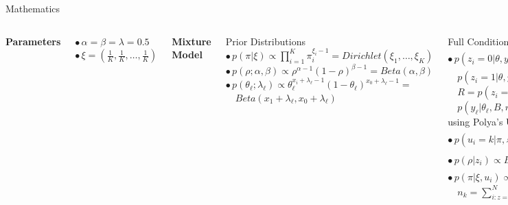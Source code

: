 \documentclass[letter,graphicx]{beamer}
\begin{document}
\begin{frame}{Mathematics}
\begin{tiny}
\begin{columns}[T]
\vspace{4mm}
\centerline{\textbf{Parameters}}
\vspace{2mm}
$\bullet \, \alpha = \beta = \lambda = 0.5$ \\
\vspace{1mm}
$\bullet \, \xi = (\frac{1}{K}, \frac{1}{K}, \ldots, \frac{1}{K})$


\column{2.5in}
\centerline{\textbf{Mixture Model}}
\vspace{2mm}
Prior Distributions \\ \vspace{1mm}
$\bullet \, p(\pi|\xi) \propto \prod_{i = 1}^K \pi_{i}^{\xi_i - 1} = Dirichlet(\xi_1, \ldots, \xi_K)$ \\
\vspace{1mm}
$\bullet \, p(\rho;\alpha,\beta) \propto \rho^{\alpha - 1}(1 - \rho)^{\beta - 1} = Beta(\alpha, \beta)$
$\bullet \, p(\theta_{\ell};\lambda_{\ell}) \propto \theta_{\ell}^{x_i + \lambda_{\ell}-1}(1 - \theta_{\ell})^{x_0 + \lambda_{\ell}-1} = $ \\ 
\vspace{1mm}
$\quad Beta(x_1 + \lambda_{\ell},x_0 + \lambda_{\ell})$ \\ 
\vspace{2mm}

Full Conditional Distributions \\ \vspace{1mm}
$\bullet \, p(z_i=0|\theta,y_i,\rho,B) = \frac{(1-\rho)^{1-z_i}\sum_{k=1}^{K} \prod_{\ell=1}^{L} p(y_{\ell}|\theta_{k,\ell},B,nocontam)}{R}$ \\ 
\vspace{1mm}
$\quad p(z_i=1|\theta,y_i,\rho,B) = \frac{\rho^{z_i}\sum_{k=1}^{K} \prod_{\ell=1}^{L} p(y_{\ell}|\theta_{k,\ell},B,contam)}{R}$ \\
 \vspace{1mm}
$\quad R = p(z_i=1|\theta,y_i,\rho,B) + p(z_i = 0|\theta,y_i,\rho,B)$ \\ 
\vspace{1mm}
$\quad p(y_{\ell} |\theta_{\ell},B,nocontam)$ and $p(y_{\ell} |\theta_{\ell},B,contam)$ calculated \\
\vspace{1mm}
\quad using Polya's Urn model for beta-binomial distribution \\
\vspace{1mm}
$\bullet \, p(u_i = k|\pi,z_i=0,y_i,\theta,B) = \frac{\pi_k \times \prod_{\ell=1}^{L} p(y_{\ell}|\theta_{k,\ell},B,nocontam)}{\sum_{k=1}^{K} \pi_k \times \prod_{\ell=1}^{L} p(y_{\ell}|\theta_{k,\ell},B,nocontam)}$ \\
\vspace{1mm}
$\bullet \, p(\rho|z_i) \propto Beta(\alpha + \sum_{i=1}^{N} z_i, \beta + N - \sum_{i=1}^{N} z_i)$ \\ \vspace{1mm}
$\bullet \, p(\pi|\xi,u_i) \propto Dirichlet(n_1 + \xi_1, \ldots, n_K + \xi_K)$ \\
\vspace{1mm}
$\quad n_k = \sum_{i:z=0}^{N} \delta(u_{i} = k)$
\end{columns}
\end{tiny}
\end{frame} 
\end{document}
